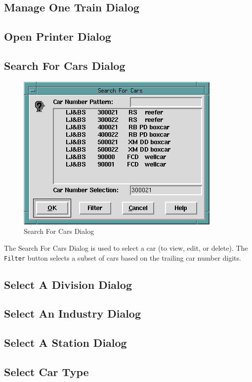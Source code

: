\subsection{Manage One Train Dialog}
\subsection{Open Printer Dialog}

\subsection{Search For Cars Dialog}
\label{sect:fcf:searchcarsdialog}

\begin{figure}[hbpt]
\begin{centering}
\includegraphics{FCFSelectACarDialog.png}
\caption{Search For Cars Dialog}
\label{fig:fcf:searchcarsdialog}
\end{centering}
\end{figure}
The Search For Cars Dialog is used to select a car (to view, edit, or
delete). The \verb=Filter= button selects a  subset of cars based on the
trailing car number digits.

\subsection{Select A Division Dialog}
\subsection{Select An Industry Dialog}
\subsection{Select A Station Dialog}
\subsection{Select Car Type}

